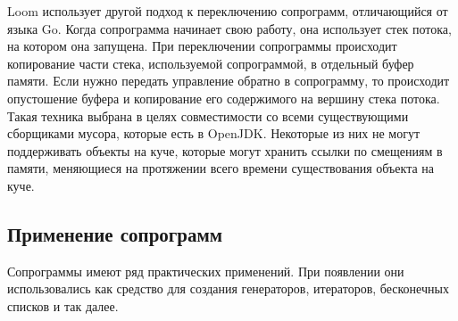 	\par
	Loom использует другой подход к переключению сопрограмм, отличающийся от языка Go. Когда сопрограмма начинает
	свою работу, она использует стек потока, на котором она запущена. При переключении сопрограммы происходит
	копирование части стека, используемой сопрограммой, в отдельный буфер памяти. Если нужно передать 
	управление обратно в сопрограмму, то происходит опустошение буфера и копирование его содержимого на 
	вершину стека потока\cite{loom-main}. Такая техника выбрана в целях совместимости со всеми существующими 
	сборщиками мусора, которые есть в OpenJDK. Некоторые из них не могут поддерживать объекты на куче, которые
	могут хранить ссылки по смещениям в памяти, меняющиеся на протяжении всего времени существования объекта на куче.
	\clearpage
	
	\subsection{Применение сопрограмм}
	Сопрограммы имеют ряд практических применений. При появлении они использовались как средство
	для создания генераторов, итераторов, бесконечных списков и так далее. 
	
